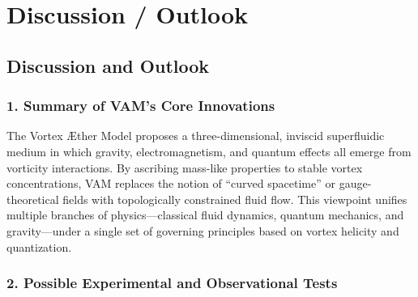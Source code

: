\section{Discussion / Outlook}

\subsection*{Discussion and Outlook}

\subsubsection*{1. Summary of VAM’s Core Innovations}
The Vortex Æther Model proposes a three-dimensional, inviscid superfluidic medium in which gravity, electromagnetism, and quantum effects all emerge from vorticity interactions. By ascribing mass-like properties to stable vortex concentrations, VAM replaces the notion of “curved spacetime” or gauge-theoretical fields with topologically constrained fluid flow. This viewpoint unifies multiple branches of physics—classical fluid dynamics, quantum mechanics, and gravity—under a single set of governing principles based on vortex helicity and quantization.

\subsubsection*{2. Possible Experimental and Observational Tests}

